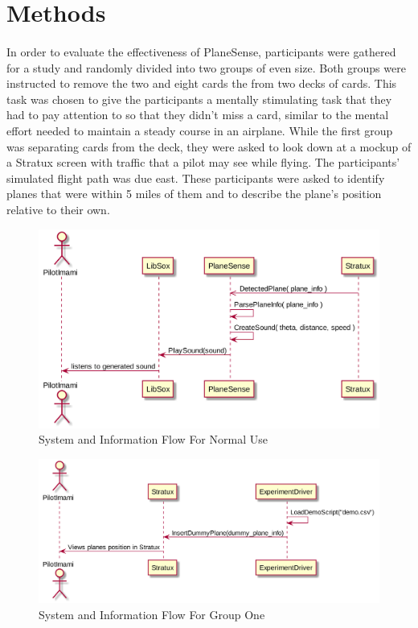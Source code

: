        
\section{Methods}


\paragraph{}
	In order to evaluate the effectiveness of PlaneSense, participants were gathered for a study and randomly divided into two groups of even size.  Both groups were instructed to remove the two and eight cards the from two decks of cards.  This task was chosen to give the participants a mentally stimulating task that they had to pay attention to so that they didn't miss a card, similar to the mental effort needed to maintain a steady course in an airplane.
	While the first group was separating cards from the deck, they were asked to look down at a mockup of a Stratux screen with traffic that a pilot may see while flying.  The participants' simulated flight path was due east.  These participants were asked to identify planes that were within 5 miles of them and to describe the plane's position relative to their own.

        \begin{figure}
          \includegraphics[width=\linewidth]{./sequence_diagram_for_plane_sense.png}
          \caption{System and Information Flow For Normal Use}
          \label{fig:n1}
        \end{figure}

        \begin{figure}
          \includegraphics[width=\linewidth]{./sequence_diagram_for_experiment_g2.png}
          \caption{System and Information Flow For Group One}
          \label{fig:g1}
        \end{figure}

